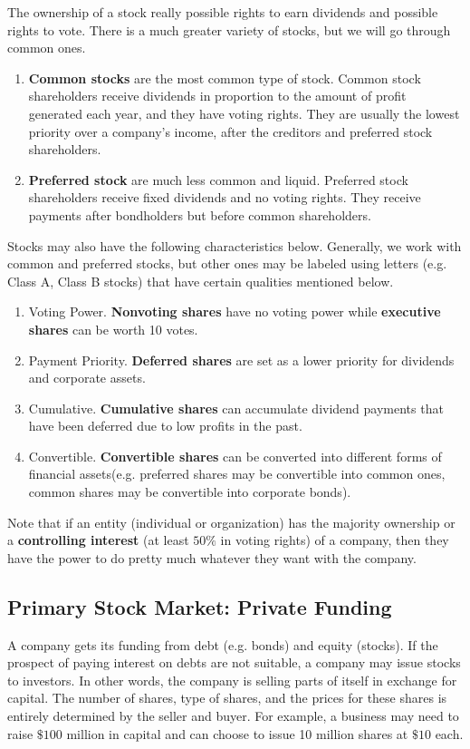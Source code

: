 \documentclass{article}
\begin{document}
    The ownership of a stock really possible rights to earn dividends and possible rights to vote. There is a much greater variety of stocks, but we will go through common ones. 
    \begin{enumerate}
      \item \textbf{Common stocks} are the most common type of stock. Common stock shareholders receive dividends in proportion to the amount of profit generated each year, and they have voting rights. They are usually the lowest priority over a company's income, after the creditors and preferred stock shareholders. 
      \item \textbf{Preferred stock} are much less common and liquid. Preferred stock shareholders receive fixed dividends and no voting rights. They receive payments after bondholders but before common shareholders. 
    \end{enumerate}
    Stocks may also have the following characteristics below. Generally, we work with common and preferred stocks, but other ones may be labeled using letters (e.g. Class A, Class B stocks) that have certain qualities mentioned below. 
    \begin{enumerate}
      \item Voting Power. \textbf{Nonvoting shares} have no voting power while \textbf{executive shares} can be worth 10 votes. 
      \item Payment Priority. \textbf{Deferred shares} are set as a lower priority for dividends and corporate assets. 
      \item Cumulative. \textbf{Cumulative shares} can accumulate dividend payments that have been deferred due to low profits in the past. 
      \item Convertible. \textbf{Convertible shares} can be converted into different forms of financial assets(e.g. preferred shares may be convertible into common ones, common shares may be convertible into corporate bonds). 
    \end{enumerate}
    Note that if an entity (individual or organization) has the majority ownership or a \textbf{controlling interest} (at least $50\%$ in voting rights) of a company, then they have the power to do pretty much whatever they want with the company. 

  \subsection{Primary Stock Market: Private Funding}

    A company gets its funding from debt (e.g. bonds) and equity (stocks). If the prospect of paying interest on debts are not suitable, a company may issue stocks to investors. In other words, the company is selling parts of itself in exchange for capital. The number of shares, type of shares, and the prices for these shares is entirely determined by the seller and buyer. For example, a business may need to raise $\$100$ million in capital and can choose to issue 10 million shares at $\$10$ each. 
\end{document}
